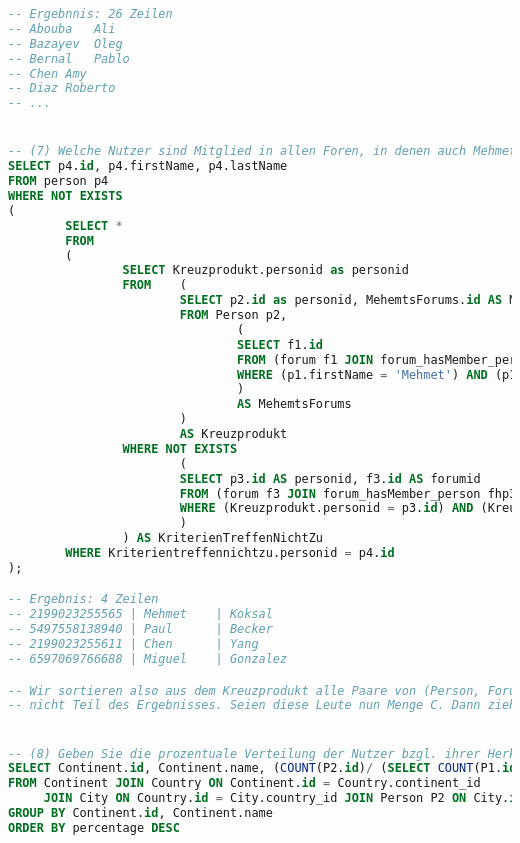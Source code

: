 \begin{lstlisting}[language=sql]
-- Ergebnnis: 26 Zeilen
-- Abouba	Ali
-- Bazayev	Oleg
-- Bernal	Pablo
-- Chen	Amy
-- Diaz	Roberto
-- ...


-- (7) Welche Nutzer sind Mitglied in allen Foren, in denen auch Mehmet Koksal Mitglied ist (Angabe Name)?
SELECT p4.id, p4.firstName, p4.lastName
FROM person p4
WHERE NOT EXISTS
(
        SELECT *
        FROM
        (
                SELECT Kreuzprodukt.personid as personid
                FROM    (
                        SELECT p2.id as personid, MehemtsForums.id AS Mehmetsforumid
                        FROM Person p2,
                                (
                                SELECT f1.id
                                FROM (forum f1 JOIN forum_hasMember_person fhp1 ON f1.id = fhp1.forum_id JOIN person p1 ON fhp1.person_id = p1.id)
                                WHERE (p1.firstName = 'Mehmet') AND (p1.lastName = 'Koksal')
                                )
                                AS MehemtsForums
                        )
                        AS Kreuzprodukt
                WHERE NOT EXISTS
                        (
                        SELECT p3.id AS personid, f3.id AS forumid
                        FROM (forum f3 JOIN forum_hasMember_person fhp3 ON f3.id = fhp3.forum_id JOIN person p3 ON fhp3.person_id = p3.id)
                        WHERE (Kreuzprodukt.personid = p3.id) AND (Kreuzprodukt.mehmetsforumid = forum_id)
                        )
                ) AS KriterienTreffenNichtZu
        WHERE Kriterientreffennichtzu.personid = p4.id
);

-- Ergebnis: 4 Zeilen
-- 2199023255565 | Mehmet    | Koksal
-- 5497558138940 | Paul      | Becker
-- 2199023255611 | Chen      | Yang
-- 6597069766688 | Miguel    | Gonzalez

-- Wir sortieren also aus dem Kreuzprodukt alle Paare von (Person, Forum) die im Datensatz sind. Leute die in allen Foren von Mehmet Mitglieder sind, werden hierdurch aussortiert. Also sind diejenigen, die wir noch haben,
-- nicht Teil des Ergebnisses. Seien diese Leute nun Menge C. Dann ziehen wir einfach von allen Personen diese Menge ab und erhalten diejenigen, die in Mehmets Foren Mitglied sind!


-- (8) Geben Sie die prozentuale Verteilung der Nutzer bzgl. ihrer Herkunft aus verschiedenen Kontinenten an!
SELECT Continent.id, Continent.name, (COUNT(P2.id)/ (SELECT COUNT(P1.id) FROM Person P1)::float)*100 AS percentage
FROM Continent JOIN Country ON Continent.id = Country.continent_id
     JOIN City ON Country.id = City.country_id JOIN Person P2 ON City.id = P2.city_id
GROUP BY Continent.id, Continent.name
ORDER BY percentage DESC


\end{lstlisting}

